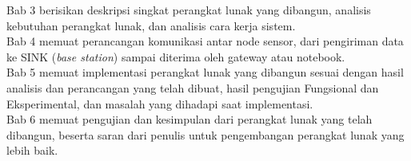 Bab 3 berisikan deskripsi singkat perangkat lunak yang dibangun, analisis kebutuhan perangkat lunak, dan analisis cara kerja sistem. 
\\

Bab 4 memuat perancangan komunikasi antar node sensor, dari pengiriman data ke SINK (\textit{base station}) sampai diterima oleh gateway atau notebook.
\\

Bab 5 memuat implementasi perangkat lunak yang dibangun sesuai dengan hasil analisis dan perancangan yang telah dibuat, hasil pengujian Fungsional dan Eksperimental, dan masalah yang dihadapi saat implementasi.
\\

Bab 6 memuat pengujian dan kesimpulan dari perangkat lunak yang telah dibangun, beserta saran dari penulis untuk pengembangan perangkat lunak yang lebih baik.


